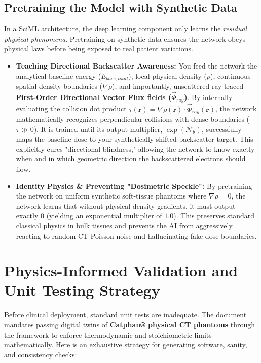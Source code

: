 \documentclass[11pt,a4paper]{article}
\begin{document}
\subsection{Pretraining the Model with Synthetic Data}
In a SciML architecture, the deep learning component only learns the \textit{residual physical phenomena}. Pretraining on synthetic data ensures the network obeys physical laws before being exposed to real patient variations.

\begin{itemize}
    \item \textbf{Teaching Directional Backscatter Awareness:} You feed the network the analytical baseline energy ($E_{base, total}$), local physical density ($\rho$), continuous spatial density boundaries ($\nabla\rho$), and importantly, unscattered ray-traced \textbf{First-Order Directional Vector Flux fields ($\vec{\Phi}_{ray}$)}. By internally evaluating the collision dot product $\tau(\mathbf{r}) = \nabla\rho(\mathbf{r}) \cdot \vec{\Phi}_{ray}(\mathbf{r})$, the network mathematically recognizes perpendicular collisions with dense boundaries ($\tau \gg 0$). It is trained until its output multiplier, $\exp(\mathcal{N}_{\theta})$, successfully maps the baseline dose to your synthetically shifted backscatter target. This explicitly cures "directional blindness," allowing the network to know exactly when and in which geometric direction the backscattered electrons should flow.
    \item \textbf{Identity Physics \& Preventing "Dosimetric Speckle":} By pretraining the network on uniform synthetic soft-tissue phantoms where $\nabla\rho = 0$, the network learns that without physical density gradients, it must output exactly $0$ (yielding an exponential multiplier of $1.0$). This preserves standard classical physics in bulk tissues and prevents the AI from aggressively reacting to random CT Poisson noise and hallucinating fake dose boundaries.
\end{itemize}

\section{Physics-Informed Validation and Unit Testing Strategy}
Before clinical deployment, standard unit tests are inadequate. The document mandates passing digital twins of \textbf{Catphan® physical CT phantoms} through the framework to enforce thermodynamic and stoichiometric limits mathematically. Here is an exhaustive strategy for generating software, sanity, and consistency checks:
\end{document}
